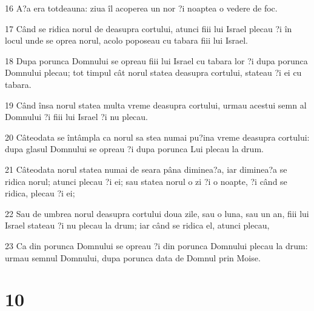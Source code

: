 \par 16 A?a era totdeauna: ziua îl acoperea un nor ?i noaptea o vedere de foc.
\par 17 Când se ridica norul de deasupra cortului, atunci fiii lui Israel plecau ?i în locul unde se oprea norul, acolo poposeau cu tabara fiii lui Israel.
\par 18 Dupa porunca Domnului se opreau fiii lui Israel cu tabara lor ?i dupa porunca Domnului plecau; tot timpul cât norul statea deasupra cortului, stateau ?i ei cu tabara.
\par 19 Când însa norul statea multa vreme deasupra cortului, urmau acestui semn al Domnului ?i fiii lui Israel ?i nu plecau.
\par 20 Câteodata se întâmpla ca norul sa stea numai pu?ina vreme deasupra cortului: dupa glasul Domnului se opreau ?i dupa porunca Lui plecau la drum.
\par 21 Câteodata norul statea numai de seara pâna diminea?a, iar diminea?a se ridica norul; atunci plecau ?i ei; sau statea norul o zi ?i o noapte, ?i când se ridica, plecau ?i ei;
\par 22 Sau de umbrea norul deasupra cortului doua zile, sau o luna, sau un an, fiii lui Israel stateau ?i nu plecau la drum; iar când se ridica el, atunci plecau,
\par 23 Ca din porunca Domnului se opreau ?i din porunca Domnului plecau la drum: urmau semnul Domnului, dupa porunca data de Domnul prin Moise.

\chapter{10}


